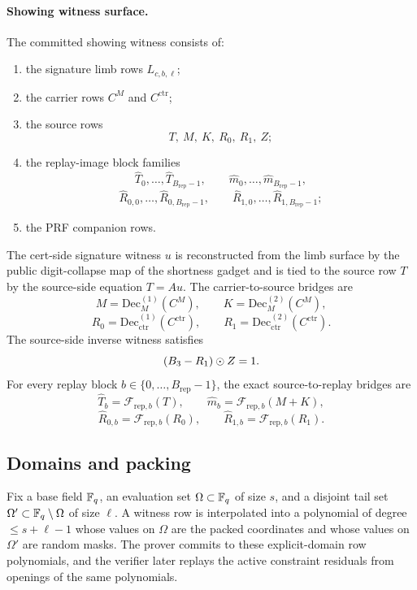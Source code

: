 \paragraph{Showing witness surface.}
The committed showing witness consists of:
\begin{enumerate}[leftmargin=1.25em]
    \item the signature limb rows \(L_{c,b,\ell}\);
    \item the carrier rows \(C^M\) and \(C^{\mathrm{ctr}}\);
    \item the source rows
    \[
    T,\ M,\ K,\ R_0,\ R_1,\ Z;
    \]
    \item the replay-image block families
    \[
    \widehat T_0,\ldots,\widehat T_{B_{\mathrm{rep}}-1},
    \qquad
    \widehat m_0,\ldots,\widehat m_{B_{\mathrm{rep}}-1},
    \]
    \[
    \widehat R_{0,0},\ldots,\widehat R_{0,B_{\mathrm{rep}}-1},
    \qquad
    \widehat R_{1,0},\ldots,\widehat R_{1,B_{\mathrm{rep}}-1};
    \]
    \item the PRF companion rows.
\end{enumerate}
The cert-side signature witness \(u\) is reconstructed from the limb surface by the public digit-collapse map of the
shortness gadget and is tied to the source row \(T\) by the source-side equation \(T=Au\). The carrier-to-source bridges are
\[
M=\mathrm{Dec}_M^{(1)}(C^M),
\qquad
K=\mathrm{Dec}_M^{(2)}(C^M),
\]
\[
R_0=\mathrm{Dec}_{\mathrm{ctr}}^{(1)}(C^{\mathrm{ctr}}),
\qquad
R_1=\mathrm{Dec}_{\mathrm{ctr}}^{(2)}(C^{\mathrm{ctr}}).
\]
The source-side inverse witness satisfies
\[
(B_3-R_1)\odot Z = 1.
\]
For every replay block \(b\in\{0,\ldots,B_{\mathrm{rep}}-1\}\), the exact source-to-replay bridges are
\[
\widehat T_b = \mathcal F_{\mathrm{rep},b}(T),
\qquad
\widehat m_b = \mathcal F_{\mathrm{rep},b}(M+K),
\]
\[
\widehat R_{0,b} = \mathcal F_{\mathrm{rep},b}(R_0),
\qquad
\widehat R_{1,b} = \mathcal F_{\mathrm{rep},b}(R_1).
\]

\subsection{Domains and packing}
Fix a base field \(\mathbb{F}_q\), an evaluation set \(\Omega\subset\mathbb{F}_q\) of size
\(s\), and a disjoint tail set \(\Omega'\subset\mathbb{F}_q\setminus\Omega\) of size
\(\ell\). A witness row is interpolated into a polynomial of degree
\(\le s+\ell-1\) whose values on \(\Omega\) are the packed coordinates and
whose values on \(\Omega'\) are random masks. The prover commits to these
explicit-domain row polynomials, and the verifier later replays the active
constraint residuals from openings of the same polynomials.

